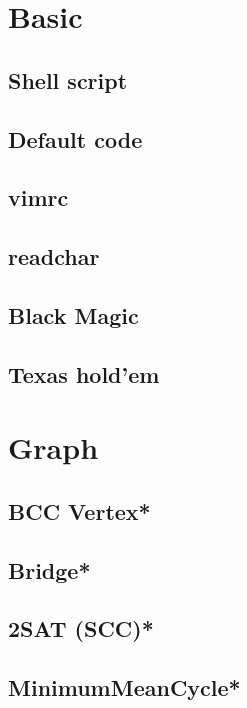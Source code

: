\section{Basic}
\subsection{Shell script}

\subsection{Default code}

\subsection{vimrc}

\subsection{readchar}

\subsection{Black Magic}

\subsection{Texas hold'em}



\section{Graph}
\subsection{BCC Vertex*} %

\subsection{Bridge*} %

\subsection{2SAT (SCC)*} %

\subsection{MinimumMeanCycle*} %

